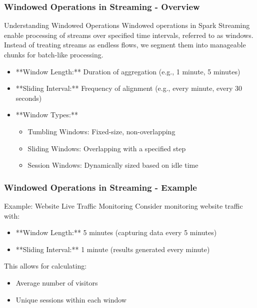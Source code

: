 \documentclass[aspectratio=169]{beamer}
\begin{document}
\begin{frame}[fragile]
    \frametitle{Windowed Operations in Streaming - Overview}
    \begin{block}{Understanding Windowed Operations}
        Windowed operations in Spark Streaming enable processing of streams over specified time intervals, referred to as windows. Instead of treating streams as endless flows, we segment them into manageable chunks for batch-like processing. 
    \end{block}
    
    \begin{itemize}
        \item **Window Length:** Duration of aggregation (e.g., 1 minute, 5 minutes)
        \item **Sliding Interval:** Frequency of alignment (e.g., every minute, every 30 seconds)
        \item **Window Types:**
        \begin{itemize}
            \item Tumbling Windows: Fixed-size, non-overlapping
            \item Sliding Windows: Overlapping with a specified step
            \item Session Windows: Dynamically sized based on idle time
        \end{itemize}
    \end{itemize}
\end{frame}

\begin{frame}[fragile]
    \frametitle{Windowed Operations in Streaming - Example}
    \begin{block}{Example: Website Live Traffic Monitoring}
        Consider monitoring website traffic with:
        \begin{itemize}
            \item **Window Length:** 5 minutes (capturing data every 5 minutes)
            \item **Sliding Interval:** 1 minute (results generated every minute)
        \end{itemize}
        
        This allows for calculating:
        \begin{itemize}
            \item Average number of visitors
            \item Unique sessions within each window
        \end{itemize}
    \end{block}
\end{frame}
\end{document}

